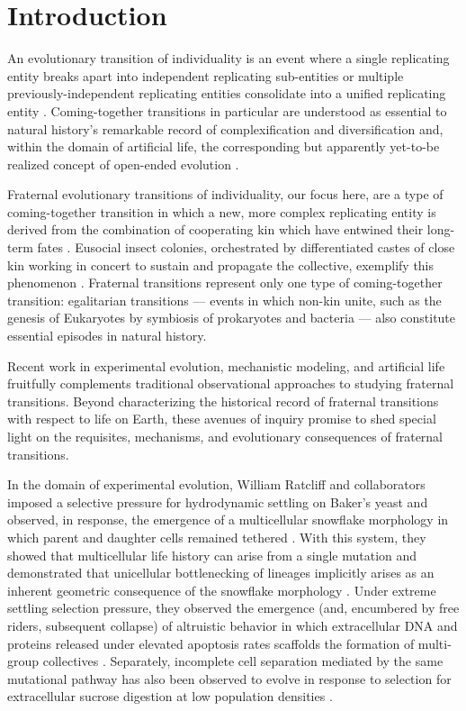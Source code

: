 \section{Introduction}

An evolutionary transition of individuality is an event where a single replicating entity breaks apart into independent replicating sub-entities or multiple previously-independent replicating entities consolidate into a unified replicating entity \citep{smith1997major}.
Coming-together transitions in particular are understood as essential to natural history's remarkable record of complexification and diversification \citep{smith1997major} and, within the domain of artificial life, the corresponding but apparently yet-to-be realized concept of open-ended evolution \citep{taylor2016open, banzhaf2016defining}.

Fraternal evolutionary transitions of individuality, our focus here, are a type of coming-together transition in which a new, more complex replicating entity is derived from the combination of cooperating kin which have entwined their long-term fates \citep{west2015major}.
Eusocial insect colonies, orchestrated by differentiated castes of close kin working in concert to sustain and propagate the collective, exemplify this phenomenon \citep{smith1997major}.
Fraternal transitions represent only one type of coming-together transition: egalitarian transitions --- events in which non-kin unite, such as the genesis of Eukaryotes by symbiosis of prokaryotes and bacteria --- also constitute essential episodes in natural history.

Recent work in experimental evolution, mechanistic modeling, and artificial life fruitfully complements traditional observational approaches to studying fraternal transitions.
Beyond characterizing the historical record of fraternal transitions with respect to life on Earth, these avenues of inquiry promise to shed special light on the requisites, mechanisms, and evolutionary consequences of fraternal transitions.

In the domain of experimental evolution, William Ratcliff and collaborators imposed a selective pressure for hydrodynamic settling on Baker's yeast and observed, in response, the emergence of a multicellular snowflake morphology in which parent and daughter cells remained tethered \citep{ratcliff2014experimental}.
With this system, they showed that multicellular life history can arise from a single mutation and demonstrated that unicellular bottlenecking of lineages implicitly arises as an inherent geometric consequence of the snowflake morphology \citep{ratcliff2015origins}.
Under extreme settling selection pressure, they observed the emergence (and, encumbered by free riders, subsequent collapse) of altruistic behavior in which extracellular DNA and proteins released under elevated apoptosis rates scaffolds the formation of multi-group collectives \citep{gulli2019evolution}.
Separately, incomplete cell separation mediated by the same mutational pathway has also been observed to evolve in response to selection for extracellular sucrose digestion at low population densities \citep{koschwanez2013improved}.


